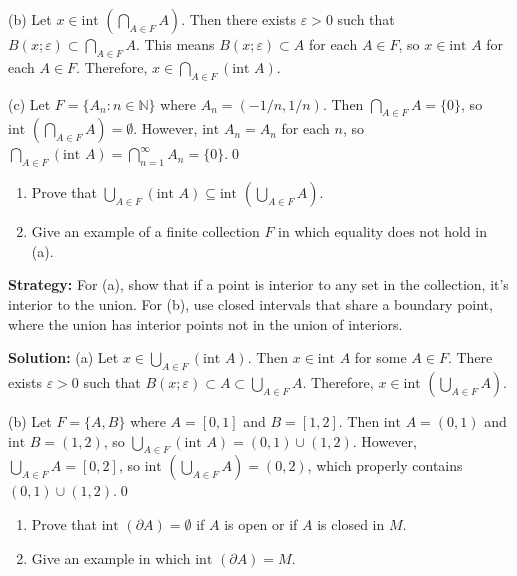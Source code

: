 (b) Let $x \in \text{int }(\bigcap_{A \in F} A)$. Then there exists $\varepsilon > 0$ such that $B(x;\varepsilon) \subset \bigcap_{A \in F} A$. This means $B(x;\varepsilon) \subset A$ for each $A \in F$, so $x \in \text{int } A$ for each $A \in F$. Therefore, $x \in \bigcap_{A \in F} (\text{int } A)$.

(c) Let $F = \{A_n : n \in \mathbb{N}\}$ where $A_n = (-1/n, 1/n)$. Then $\bigcap_{A \in F} A = \{0\}$, so $\text{int }(\bigcap_{A \in F} A) = \emptyset$. However, $\text{int } A_n = A_n$ for each $n$, so $\bigcap_{A \in F} (\text{int } A) = \bigcap_{n=1}^{\infty} A_n = \{0\}$.\qed


\begin{problembox}
\begin{enumerate}[label=\alph*)]
\item Prove that \(\bigcup_{A \in F} (\text{int } A) \subseteq \text{int } \left(\bigcup_{A \in F} A\right)\).
\item Give an example of a finite collection \( F \) in which equality does not hold in (a).
\end{enumerate}
\end{problembox}

\noindent\textbf{Strategy:} For (a), show that if a point is interior to any set in the collection, it's interior to the union. For (b), use closed intervals that share a boundary point, where the union has interior points not in the union of interiors.

\bigskip\noindent\textbf{Solution:} 
(a) Let $x \in \bigcup_{A \in F} (\text{int } A)$. Then $x \in \text{int } A$ for some $A \in F$. There exists $\varepsilon > 0$ such that $B(x;\varepsilon) \subset A \subset \bigcup_{A \in F} A$. Therefore, $x \in \text{int }(\bigcup_{A \in F} A)$.

(b) Let $F = \{A, B\}$ where $A = [0,1]$ and $B = [1,2]$. Then $\text{int } A = (0,1)$ and $\text{int } B = (1,2)$, so $\bigcup_{A \in F} (\text{int } A) = (0,1) \cup (1,2)$. However, $\bigcup_{A \in F} A = [0,2]$, so $\text{int }(\bigcup_{A \in F} A) = (0,2)$, which properly contains $(0,1) \cup (1,2)$.\qed


\begin{problembox}
\begin{enumerate}[label=\alph*)]
\item Prove that \(\text{int } (\partial A) = \emptyset\) if \( A \) is open or if \( A \) is closed in \( M \).
\item Give an example in which \(\text{int } (\partial A) = M\).
\end{enumerate}
\end{problembox}

